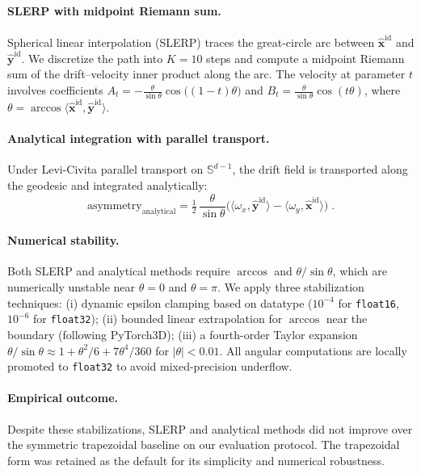 \paragraph{SLERP with midpoint Riemann sum.}
Spherical linear interpolation (SLERP) traces the great-circle arc between $\hat{\mathbf{x}}^{\mathrm{id}}$ and $\hat{\mathbf{y}}^{\mathrm{id}}$. We discretize the path into $K{=}10$ steps and compute a midpoint Riemann sum of the drift--velocity inner product along the arc. The velocity at parameter $t$ involves coefficients $A_t = -\frac{\theta}{\sin\theta}\cos\bigl((1{-}t)\theta\bigr)$ and $B_t = \frac{\theta}{\sin\theta}\cos(t\theta)$, where $\theta = \arccos\langle \hat{\mathbf{x}}^{\mathrm{id}}, \hat{\mathbf{y}}^{\mathrm{id}} \rangle$.

\paragraph{Analytical integration with parallel transport.}
Under Levi-Civita parallel transport on $\mathbb{S}^{d-1}$, the drift field is transported along the geodesic and integrated analytically:
\begin{equation}
    \text{asymmetry}_{\mathrm{analytical}} = \tfrac{1}{2}\,\frac{\theta}{\sin\theta}\bigl(\langle \omega_x, \hat{\mathbf{y}}^{\mathrm{id}} \rangle - \langle \omega_y, \hat{\mathbf{x}}^{\mathrm{id}} \rangle\bigr) \;.
    \label{eq:analytical_integration}
\end{equation}

\paragraph{Numerical stability.}
Both SLERP and analytical methods require $\arccos$ and $\theta/\sin\theta$, which are numerically unstable near $\theta{=}0$ and $\theta{=}\pi$. We apply three stabilization techniques: (i) dynamic epsilon clamping based on datatype ($10^{-4}$ for \texttt{float16}, $10^{-6}$ for \texttt{float32}); (ii) bounded linear extrapolation for $\arccos$ near the boundary (following PyTorch3D); (iii) a fourth-order Taylor expansion $\theta/\sin\theta \approx 1 + \theta^2/6 + 7\theta^4/360$ for $|\theta| < 0.01$. All angular computations are locally promoted to \texttt{float32} to avoid mixed-precision underflow.

\paragraph{Empirical outcome.}
Despite these stabilizations, SLERP and analytical methods did not improve over the symmetric trapezoidal baseline on our evaluation protocol. The trapezoidal form was retained as the default for its simplicity and numerical robustness.

